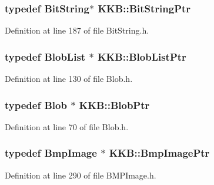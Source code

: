 \subsubsection[{\texorpdfstring{Bit\+String\+Ptr}{BitStringPtr}}]{\setlength{\rightskip}{0pt plus 5cm}typedef {\bf Bit\+String}$\ast$ {\bf K\+K\+B\+::\+Bit\+String\+Ptr}}\hypertarget{namespace_k_k_b_a9236416b9881803383623e31488bbf85}{}\label{namespace_k_k_b_a9236416b9881803383623e31488bbf85}


Definition at line 187 of file Bit\+String.\+h.

\subsubsection[{\texorpdfstring{Blob\+List\+Ptr}{BlobListPtr}}]{\setlength{\rightskip}{0pt plus 5cm}typedef {\bf Blob\+List} $\ast$ {\bf K\+K\+B\+::\+Blob\+List\+Ptr}}\hypertarget{namespace_k_k_b_a43f0fcfaef97a91bc290134c9a407d4d}{}\label{namespace_k_k_b_a43f0fcfaef97a91bc290134c9a407d4d}


Definition at line 130 of file Blob.\+h.

\subsubsection[{\texorpdfstring{Blob\+Ptr}{BlobPtr}}]{\setlength{\rightskip}{0pt plus 5cm}typedef {\bf Blob} $\ast$ {\bf K\+K\+B\+::\+Blob\+Ptr}}\hypertarget{namespace_k_k_b_a4fa91a7788b982654fca9d7319b98cb4}{}\label{namespace_k_k_b_a4fa91a7788b982654fca9d7319b98cb4}


Definition at line 70 of file Blob.\+h.

\subsubsection[{\texorpdfstring{Bmp\+Image\+Ptr}{BmpImagePtr}}]{\setlength{\rightskip}{0pt plus 5cm}typedef {\bf Bmp\+Image} $\ast$ {\bf K\+K\+B\+::\+Bmp\+Image\+Ptr}}\hypertarget{namespace_k_k_b_a94f37925e0d532e2bc225a4ba64270cf}{}\label{namespace_k_k_b_a94f37925e0d532e2bc225a4ba64270cf}


Definition at line 290 of file B\+M\+P\+Image.\+h.

